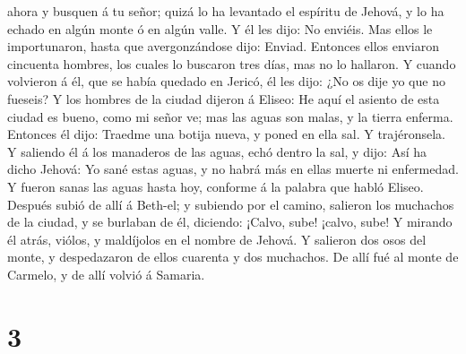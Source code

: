 ahora y busquen á tu señor; quizá lo ha levantado el espíritu de Jehová,
y lo ha echado en algún monte ó en algún valle. Y él les dijo: No
enviéis.  Mas ellos le importunaron, hasta que
avergonzándose dijo: Enviad. Entonces ellos enviaron cincuenta hombres,
los cuales lo buscaron tres días, mas no lo hallaron.  Y
cuando volvieron á él, que se había quedado en Jericó, él les dijo: ¿No
os dije yo que no fueseis?  Y los hombres de la ciudad
dijeron á Eliseo: He aquí el asiento de esta ciudad es bueno, como mi
señor ve; mas las aguas son malas, y la tierra enferma. 
Entonces él dijo: Traedme una botija nueva, y poned en ella sal. Y
trajéronsela.  Y saliendo él á los manaderos de las
aguas, echó dentro la sal, y dijo: Así ha dicho Jehová: Yo sané estas
aguas, y no habrá más en ellas muerte ni enfermedad.  Y
fueron sanas las aguas hasta hoy, conforme á la palabra que habló
Eliseo.  Después subió de allí á Beth-el; y subiendo por
el camino, salieron los muchachos de la ciudad, y se burlaban de él,
diciendo: ¡Calvo, sube! ¡calvo, sube!  Y mirando él
atrás, viólos, y maldíjolos en el nombre de Jehová. Y salieron dos osos
del monte, y despedazaron de ellos cuarenta y dos muchachos.
 De allí fué al monte de Carmelo, y de allí volvió á
Samaria.

\hypertarget{section-2}{%
\section{3}\label{section-2}}

